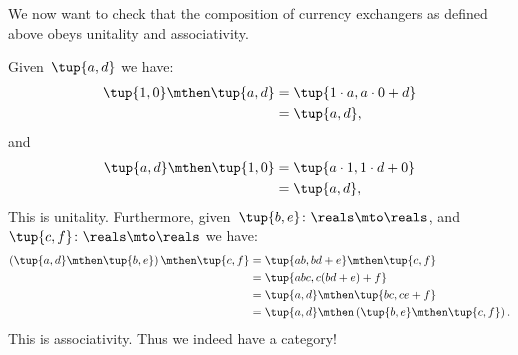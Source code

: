 We now want to check that the composition of currency exchangers as defined above obeys unitality and associativity.

Given~$\tup{a,d}$ we have:
\begin{equation*}
    \begin{aligned}
        \tup{1,0}\mthen\tup{a,d} & =\tup{1\cdot a, a\cdot 0+d} \\
                                 & =\tup{a,d},
    \end{aligned}
\end{equation*}
and
\begin{equation*}
    \begin{aligned}
        \tup{a,d}\mthen \tup{1,0} & =\tup{a\cdot 1, 1\cdot d+0} \\
                                  & =\tup{a,d},
    \end{aligned}
\end{equation*}
This is unitality.
Furthermore, given~$\tup{b,e}\colon \reals \mto \reals$, and~$\tup{c,f}\colon \reals \mto \reals$ we have:
\begin{equation*}
    \begin{aligned}
        \left( \tup{a,d}\mthen \tup{b,e}\right)\mthen \tup{c,f} & =\tup{ab,bd+e}\mthen \tup{c,f}                            \\
                                                                & =\tup{abc,c(bd+e)+f}                                      \\
                                                                & =\tup{a,d}\mthen \tup{bc,ce+f}                            \\
                                                                & =\tup{a,d}\mthen \left( \tup{b,e}\mthen \tup{c,f}\right).
    \end{aligned}
\end{equation*}
This is associativity.
Thus we indeed have a category!


